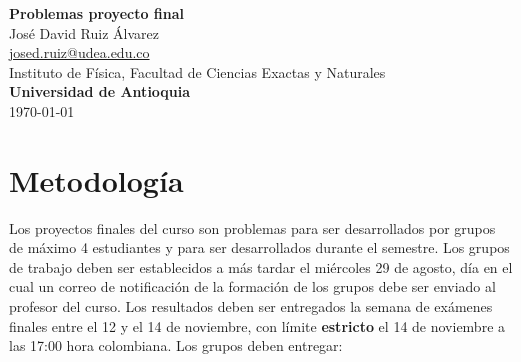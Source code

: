 \documentclass[10.5pt]{article}
\begin{document}
\noindent
\begin{minipage}[b]{0.75\linewidth}
{\LARGE\bf Problemas proyecto final}\\ %
\large{Jos\'{e} David Ruiz \'{A}lvarez} \\
\small{\href{mailto:josed.ruiz@udea.edu.co}{josed.ruiz@udea.edu.co}} \\ %
\normalsize{Instituto de Física, Facultad de Ciencias Exactas y Naturales} \\%
\normalsize{\bf Universidad de Antioquia} \\[8mm]
\today %
\end{minipage}%



\section{Metodología}

Los proyectos finales del curso son problemas para ser desarrollados por grupos de máximo 4 estudiantes y para ser desarrollados durante el semestre. Los grupos de trabajo deben ser establecidos a más tardar el miércoles 29 de agosto, día en el cual un correo de notificación de la formación de los grupos debe ser enviado al profesor del curso. Los resultados deben ser entregados la semana de exámenes finales entre el 12 y el 14 de noviembre, con límite {\bf estricto} el 14 de noviembre a las 17:00 hora colombiana. Los grupos deben entregar:
\end{document}
